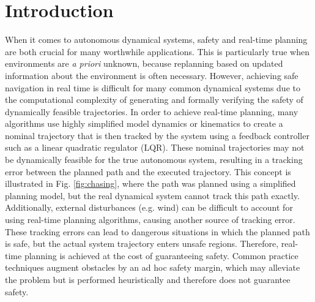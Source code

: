 \section{Introduction}

When it comes to autonomous dynamical systems, safety and real-time planning are both crucial for many worthwhile applications.
This is particularly true when environments are \textit{a priori} unknown, because replanning based on updated information about the environment is often necessary. 
However, achieving safe navigation in real time is difficult for many common dynamical systems due to the computational complexity of generating and formally verifying the safety of dynamically feasible trajectories.
 In order to achieve real-time planning, many algorithms use highly simplified model dynamics or kinematics to create a nominal trajectory that is then tracked by the system using a feedback controller such as a linear quadratic regulator (LQR).  These nominal trajectories may not be dynamically feasible for the true autonomous system, resulting in a tracking error between the planned path and the executed trajectory.
 This concept is illustrated in Fig. \ref{fig:chasing}, where the path was planned using a simplified planning model, but the real dynamical system cannot track this path exactly. 
Additionally, external disturbances (e.g. wind) can be difficult to account for using real-time planning algorithms, causing another source of tracking error. 
These tracking errors can lead to dangerous situations in which the planned path is safe, but the actual system trajectory enters unsafe regions.  Therefore, real-time planning is achieved at the cost of guaranteeing safety.  Common practice techniques augment obstacles by an ad hoc safety margin, which may alleviate the problem but is performed heuristically and therefore does not guarantee safety.
